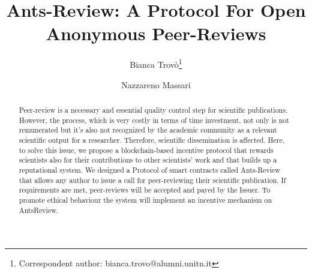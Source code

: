 \documentclass[runningheads]{llncs}
\begin{document}
%
\title{Ants-Review: A Protocol For Open Anonymous Peer-Reviews}
%
%
\author{Bianca Trovò\thanks{Correspondent author: bianca.trovo@alumni.unitn.it} \and
Nazzareno Massari}
%
%
%
\maketitle              %
%
\begin{abstract}
Peer-review is a necessary and essential quality control step for scientific publications. However, the process, which is very costly in terms of time investment, not only is not remunerated but it’s also not recognized by the academic community as a relevant scientific output for a researcher. Therefore, scientific dissemination is affected. Here, to solve this issue, we propose a blockchain-based incentive protocol that rewards scientists also for their contributions to other scientists’ work and that builds up a reputational system. We designed a Protocol of smart contracts called Ants-Review that allows any author to issue a call for peer-reviewing their scientific publication. If requirements are met, peer-reviews will be accepted and payed by the Issuer. To promote ethical behaviour the system will implement an incentive mechanism on AntsReview.
\end{abstract}
%
%
\end{document}
